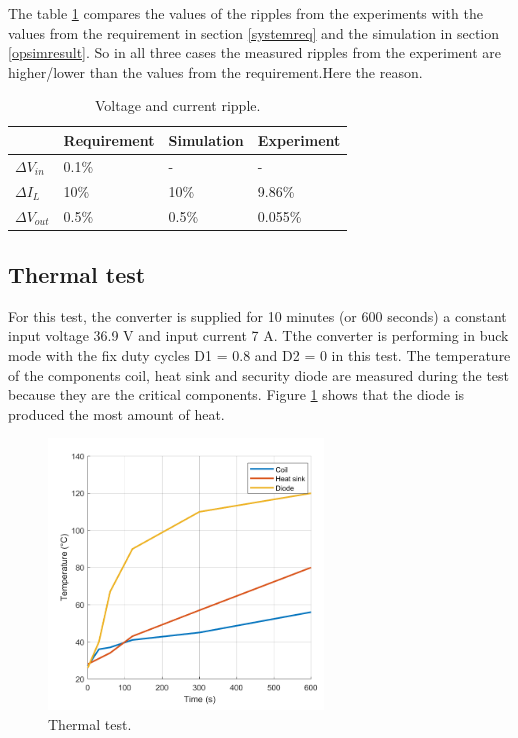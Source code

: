 The table \ref{tab:ripple} compares the values of the ripples from the experiments with the values from the requirement in section \ref{systemreq} and the simulation in section \ref{opsimresult}. So in all three cases the measured ripples from the experiment are higher/lower than the values from the requirement.Here the reason.

\begin{table}[H]
	\centering
	\begin{tabular}{|>{\centering}p{3.5cm}|p{3cm}|p{3cm}|p{3cm}|}
		\hline
		\rowcolor{lightgray} \textbf{} & \textbf{Requirement} & \textbf{Simulation}  & \textbf{Experiment}   \tabularnewline \hline
		$\Delta V_{in}$ & 0.1\% & - & - \tabularnewline \hline
		$\Delta I_{L}$ & 10\% & 10\% & 9.86\% \tabularnewline \hline
		$\Delta V_{out}$  & 0.5\% & 0.5\% & 0.055\% \tabularnewline \hline
		
	\end{tabular}
	\caption{Voltage and current ripple.}
	\label{tab:ripple}
\end{table}


\subsection{Thermal test}

For this test, the converter is supplied for 10 minutes (or 600 seconds) a constant input voltage 36.9 V and input current 7 A. Tthe converter is performing in buck mode with the fix duty cycles D1 = 0.8 and D2 = 0 in this test. The temperature of the components coil, heat sink and security diode are measured during the test because they are the critical components. Figure \ref{Testthermal} shows that the diode is produced the most amount of heat.

\begin{figure}[H]
	\begin{center}
		\includegraphics[width=0.65\textwidth]{../Pictures/P1/Test/Thermal_test_with_heat_sink}
		\caption{Thermal test.}
		\label{Testthermal}
	\end{center}	
\end{figure}

